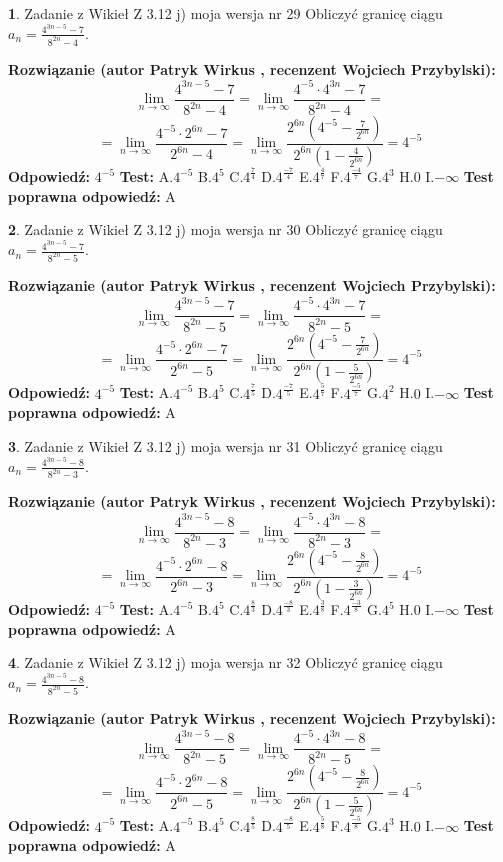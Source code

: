 \documentclass[12pt, a4paper]{article}
\theoremstyle{definition} %
\newtheorem{zad}{}
\newcommand{\zadStart}[1]{\begin{zad}#1\newline}
\newcommand{\zadStop}{\end{zad}}
\newcommand{\rozwStart}[2]{\noindent \textbf{Rozwiązanie (autor #1 , recenzent #2): }\newline}
\newcommand{\rozwStop}{\newline}
\newcommand{\odpStart}{\noindent \textbf{Odpowiedź:}\newline}
\newcommand{\odpStop}{\newline}
\newcommand{\testStart}{\noindent \textbf{Test:}\newline}
\newcommand{\testStop}{\newline}
\newcommand{\kluczStart}{\noindent \textbf{Test poprawna odpowiedź:}\newline}
\newcommand{\kluczStop}{\newline}
\begin{document}
\zadStart{Zadanie z Wikieł Z 3.12 j) moja wersja nr 29}
Obliczyć granicę ciągu $a_{n}=\frac{4^{3n-5}-7}{8^{2n}-4}$.
\zadStop
\rozwStart{Patryk Wirkus}{Wojciech Przybylski}
$$\lim\limits_{n\to\infty}\frac{4^{3n-5}-7}{8^{2n}-4}= \lim\limits_{n\to\infty}\frac{4^{-5} \cdot 4^{3n}-7}{8^{2n}-4}=$$
$$= \lim\limits_{n\to\infty}\frac{4^{-5} \cdot 2^{6n}-7}{2^{6n}-4}= \lim\limits_{n\to\infty}\frac{2^{6n}(4^{-5} - \frac{7}{2^{6n}})}{2^{6n}(1-\frac{4}{2^{6n}})}= 4^{-5}$$
\rozwStop
\odpStart
$4^{-5}$
\odpStop
\testStart
A.$4^{-5}$
B.$4^{5}$
C.$4^{\frac{7}{4}}$
D.$4^{\frac{-7}{4}}$
E.$4^{\frac{4}{7}}$
F.$4^{\frac{-4}{7}}$
G.$4^{3}$
H.$0$
I.$-\infty$
\testStop
\kluczStart
A
\kluczStop



\zadStart{Zadanie z Wikieł Z 3.12 j) moja wersja nr 30}
Obliczyć granicę ciągu $a_{n}=\frac{4^{3n-5}-7}{8^{2n}-5}$.
\zadStop
\rozwStart{Patryk Wirkus}{Wojciech Przybylski}
$$\lim\limits_{n\to\infty}\frac{4^{3n-5}-7}{8^{2n}-5}= \lim\limits_{n\to\infty}\frac{4^{-5} \cdot 4^{3n}-7}{8^{2n}-5}=$$
$$= \lim\limits_{n\to\infty}\frac{4^{-5} \cdot 2^{6n}-7}{2^{6n}-5}= \lim\limits_{n\to\infty}\frac{2^{6n}(4^{-5} - \frac{7}{2^{6n}})}{2^{6n}(1-\frac{5}{2^{6n}})}= 4^{-5}$$
\rozwStop
\odpStart
$4^{-5}$
\odpStop
\testStart
A.$4^{-5}$
B.$4^{5}$
C.$4^{\frac{7}{5}}$
D.$4^{\frac{-7}{5}}$
E.$4^{\frac{5}{7}}$
F.$4^{\frac{-5}{7}}$
G.$4^{2}$
H.$0$
I.$-\infty$
\testStop
\kluczStart
A
\kluczStop



\zadStart{Zadanie z Wikieł Z 3.12 j) moja wersja nr 31}
Obliczyć granicę ciągu $a_{n}=\frac{4^{3n-5}-8}{8^{2n}-3}$.
\zadStop
\rozwStart{Patryk Wirkus}{Wojciech Przybylski}
$$\lim\limits_{n\to\infty}\frac{4^{3n-5}-8}{8^{2n}-3}= \lim\limits_{n\to\infty}\frac{4^{-5} \cdot 4^{3n}-8}{8^{2n}-3}=$$
$$= \lim\limits_{n\to\infty}\frac{4^{-5} \cdot 2^{6n}-8}{2^{6n}-3}= \lim\limits_{n\to\infty}\frac{2^{6n}(4^{-5} - \frac{8}{2^{6n}})}{2^{6n}(1-\frac{3}{2^{6n}})}= 4^{-5}$$
\rozwStop
\odpStart
$4^{-5}$
\odpStop
\testStart
A.$4^{-5}$
B.$4^{5}$
C.$4^{\frac{8}{3}}$
D.$4^{\frac{-8}{3}}$
E.$4^{\frac{3}{8}}$
F.$4^{\frac{-3}{8}}$
G.$4^{5}$
H.$0$
I.$-\infty$
\testStop
\kluczStart
A
\kluczStop



\zadStart{Zadanie z Wikieł Z 3.12 j) moja wersja nr 32}
Obliczyć granicę ciągu $a_{n}=\frac{4^{3n-5}-8}{8^{2n}-5}$.
\zadStop
\rozwStart{Patryk Wirkus}{Wojciech Przybylski}
$$\lim\limits_{n\to\infty}\frac{4^{3n-5}-8}{8^{2n}-5}= \lim\limits_{n\to\infty}\frac{4^{-5} \cdot 4^{3n}-8}{8^{2n}-5}=$$
$$= \lim\limits_{n\to\infty}\frac{4^{-5} \cdot 2^{6n}-8}{2^{6n}-5}= \lim\limits_{n\to\infty}\frac{2^{6n}(4^{-5} - \frac{8}{2^{6n}})}{2^{6n}(1-\frac{5}{2^{6n}})}= 4^{-5}$$
\rozwStop
\odpStart
$4^{-5}$
\odpStop
\testStart
A.$4^{-5}$
B.$4^{5}$
C.$4^{\frac{8}{5}}$
D.$4^{\frac{-8}{5}}$
E.$4^{\frac{5}{8}}$
F.$4^{\frac{-5}{8}}$
G.$4^{3}$
H.$0$
I.$-\infty$
\testStop
\kluczStart
A
\kluczStop
\end{document}
